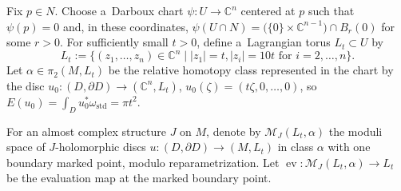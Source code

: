 \documentclass[10pt,a4paper]{amsart}
\numberwithin{equation}{section}
\newcommand{\bC}{{\mathbb C}}
\newcommand{\ev}{\operatorname{ev}}
\theoremstyle{definition}
\begin{document}
Fix $p\in N$. Choose a~Darboux chart $\psi\colon U\to \bC^{n}$ centered at $p$ such that $\psi(p)=0$ and, in these coordinates,
$
\psi(U\cap N)=\bigl(\{0\}\times \bC^{n-1}\bigr)\cap B_{r}(0)
$
for some $r>0$.
For sufficiently small $t>0$, define a~Lagrangian torus $L_t\subset U$ by
\[
L_t:=\{(z_1,\dots,z_n)\in \bC^n \mid |z_1|=t, |z_i|=10t \text{ for }i=2,\dots,n\}.
\]
Let $\alpha\in \pi_2(M,L_t)$ be the relative homotopy class represented in the chart by the disc
$
u_0\colon  (D,\partial D)\allowbreak\to (\bC^n,L_t)$, $ u_0(\zeta)=(t\zeta,0,\dots,0)$,
so $E(u_0)=\int_D u_0^*\omega_{\mathrm{std}}=\pi t^{2}$.

For an almost complex structure $J$ on $M$, denote by $\mathcal{M}_{J}(L_t,\alpha)$ the moduli space of $J$\nobreakdash-holo\-morphic discs $u\colon(D,\partial D)\to(M,L_t)$ in class $\alpha$ with one boundary marked point, modulo reparametrization. Let
$
\ev\colon \mathcal{M}_{J}(L_t,\alpha)\to L_t
$
be the evaluation map at the marked boundary point.
\end{document}
